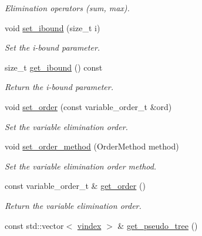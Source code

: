 \begin{DoxyCompactItemize}
\begin{DoxyCompactList}\small\item\em Elimination operators (sum, max). \end{DoxyCompactList}\item 
void \hyperlink{classmerlin_1_1ijgp_a96bd81b7e90ec19825886c83ddfa96c8}{set\+\_\+ibound} (size\+\_\+t i)
\begin{DoxyCompactList}\small\item\em Set the i-\/bound parameter. \end{DoxyCompactList}\item 
\hypertarget{classmerlin_1_1ijgp_a8ed83bc7670ed66bbce5e7659031c8b8}{}size\+\_\+t \hyperlink{classmerlin_1_1ijgp_a8ed83bc7670ed66bbce5e7659031c8b8}{get\+\_\+ibound} () const \label{classmerlin_1_1ijgp_a8ed83bc7670ed66bbce5e7659031c8b8}

\begin{DoxyCompactList}\small\item\em Return the i-\/bound parameter. \end{DoxyCompactList}\item 
void \hyperlink{classmerlin_1_1ijgp_a606c7c45f03321907581254e022ac449}{set\+\_\+order} (const variable\+\_\+order\+\_\+t \&ord)
\begin{DoxyCompactList}\small\item\em Set the variable elimination order. \end{DoxyCompactList}\item 
void \hyperlink{classmerlin_1_1ijgp_a0ef14c891c534a6b5b060921871d2c61}{set\+\_\+order\+\_\+method} (Order\+Method method)
\begin{DoxyCompactList}\small\item\em Set the variable elimination order method. \end{DoxyCompactList}\item 
\hypertarget{classmerlin_1_1ijgp_a7deef61c7bbda358a1d0ecc6841cff81}{}const variable\+\_\+order\+\_\+t \& \hyperlink{classmerlin_1_1ijgp_a7deef61c7bbda358a1d0ecc6841cff81}{get\+\_\+order} ()\label{classmerlin_1_1ijgp_a7deef61c7bbda358a1d0ecc6841cff81}

\begin{DoxyCompactList}\small\item\em Return the variable elimination order. \end{DoxyCompactList}\item 
\hypertarget{classmerlin_1_1ijgp_a1677ea16e2146f488c0247dcb27278a4}{}const std\+::vector$<$ \hyperlink{classmerlin_1_1ijgp_a4c3416087411a776f76a630217515d94}{vindex} $>$ \& \hyperlink{classmerlin_1_1ijgp_a1677ea16e2146f488c0247dcb27278a4}{get\+\_\+pseudo\+\_\+tree} ()\label{classmerlin_1_1ijgp_a1677ea16e2146f488c0247dcb27278a4}


\end{DoxyCompactItemize}
